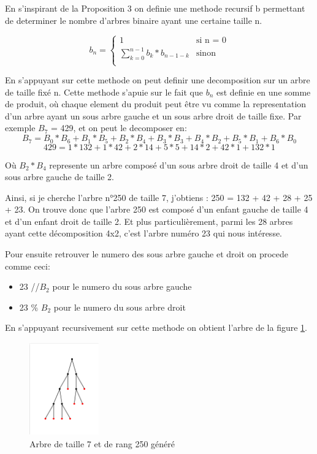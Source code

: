 \documentclass[french]{article}
\begin{document}
En s'inspirant de la Proposition 3 on definie une methode recursif b permettant de determiner le nombre d'arbres binaire ayant une certaine taille n.

\begin{equation}
    b_n =
    \begin{cases}
        1 & \text{si n = 0}\\
        \sum_{k=0}^{n-1}b_k*b_{n-1-k}  & \text{sinon}\\
    \end{cases}      
\end{equation}

En s'appuyant sur cette methode on peut definir une decomposition sur un arbre de taille fixé n. Cette methode s'apuie sur le fait que \(b_n\) est definie en une somme de produit, où chaque element du produit peut être vu comme la representation d'un arbre ayant un sous arbre gauche et un sous arbre droit de taille fixe. Par exemple \(B_7\) = 429, et on peut le decomposer en:
\[B_7=B_0*B_6+B_1*B_5+B_2*B_4+B_3*B_3+B_4*B_2+B_5*B_1+B_6*B_0\]
\[429=1*132+1*42+2*14+5*5+14*2+42*1+132*1\]

Où \(B_2*B_4\) represente un arbre composé d'un sous arbre droit de taille 4 et d'un sous arbre gauche de taille 2.

Ainsi, si je cherche l'arbre n\si{\degree}250 de taille 7, j'obtiens : 250 = 132 + 42 + 28 + 25 + 23. On trouve donc que l'arbre 250 est composé d'un enfant gauche de taille 4 et d'un enfant droit de taille 2. Et plus particulièrement, parmi les 28 arbres ayant cette décomposition 4x2, c'est l'arbre numéro 23 qui nous intéresse.


Pour ensuite retrouver le numero des sous arbre gauche et droit on procede comme ceci:
\begin{itemize}
    \item 23 //\( B_2 \) pour le numero du sous arbre gauche
    \item 23 \% \(B_2\)   pour le numero du sous arbre droit
\end{itemize}

En s'appuyant recursivement sur cette methode on obtient l'arbre de la figure \ref{fig:generation d'arbre}.

\begin{figure}[htp]
    \centering
    \includegraphics[width=3cm, height=4cm]{tree generation.png}
    \caption{Arbre de taille 7 et de rang 250 généré}
    \label{fig:generation d'arbre}
\end{figure}
\end{document}
